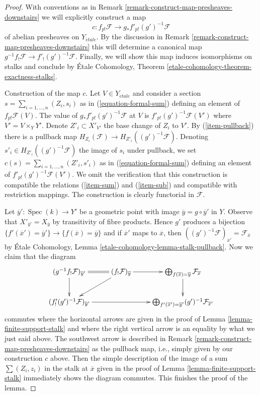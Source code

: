 \documentclass{stacks-project}
\theoremstyle{plain}
\theoremstyle{definition}
\theoremstyle{remark}
\numberwithin{equation}{subsection}
\def\Spec{\mathop{\mathrm{Spec}}}
\def\etale{{\acute{e}tale}}
\begin{document}
\begin{proof}
With conventions as in Remark \ref{remark-construct-map-presheaves-downstairs}
we will explicitly construct a map
$$
c : f_{p!}\mathcal{F} \longrightarrow g_*f'_{p!}(g')^{-1}\mathcal{F}
$$
of abelian presheaves on $Y_\etale$. By the discussion in
Remark \ref{remark-construct-map-presheaves-downstairs}
this will determine a canonical map
$g^{-1}f_!\mathcal{F} \to f'_!(g')^{-1}\mathcal{F}$. Finally, we
will show this map induces isomorphisms on stalks and conclude by
\'Etale Cohomology, Theorem \ref{etale-cohomology-theorem-exactness-stalks}.

\medskip\noindent
Construction of the map $c$. Let $V \in Y_\etale$ and consider a section
$s = \sum_{i = 1, \ldots, n} (Z_i, s_i)$ as in
(\ref{equation-formal-sum}) defining an element of $f_{p!}\mathcal{F}(V)$.
The value of $g_*f'_{p!}(g')^{-1}\mathcal{F}$ at $V$ is
$f'_{p!}(g')^{-1}\mathcal{F}(V')$ where $V' = V \times_Y Y'$.
Denote $Z'_i \subset X'_{V'}$ the base change of $Z_i$ to $V'$.
By (\ref{item-pullback}) there is a pullback map
$H_{Z_i}(\mathcal{F}) \to H_{Z'_i}((g')^{-1}\mathcal{F})$.
Denoting $s'_i \in H_{Z'_i}((g')^{-1}\mathcal{F})$ the image of $s_i$
under pullback, we set $c(s) = \sum_{i = 1, \ldots, n} (Z'_i, s'_i)$ as in
(\ref{equation-formal-sum}) defining an element of
$f'_{p!}(g')^{-1}\mathcal{F}(V')$. We omit the verification
that this construction is compatible the relations
(\ref{item-sum}) and (\ref{item-sub}) and compatible
with restriction mappings. The construction is clearly
functorial in $\mathcal{F}$.

\medskip\noindent
Let $\overline{y}' : \Spec(k) \to Y'$ be a geometric point with image
$\overline{y} = g \circ \overline{y}'$ in $Y$. Observe that
$X'_{\overline{y}'} = X_{\overline{y}}$ by transitivity of
fibre products. Hence $g'$ produces a bijection
$\{f'(\overline{x}') = \overline{y}'\} \to \{f(\overline{x}) = \overline{y}\}$
and if $\overline{x}'$ maps to $\overline{x}$, then
$((g')^{-1}\mathcal{F})_{\overline{x}'} = \mathcal{F}_{\overline{x}}$
by \'Etale Cohomology, Lemma \ref{etale-cohomology-lemma-stalk-pullback}.
Now we claim that the diagram
$$
\xymatrix{
(g^{-1}f_!\mathcal{F})_{\overline{y}'} \ar@{=}[r] \ar[d] &
(f_!\mathcal{F})_{\overline{y}} \ar[r] \ar[ld] &
\bigoplus\nolimits_{f(\overline{x}) = \overline{y}}
\mathcal{F}_{\overline{x}} \ar[d]
\\
(f'_!(g')^{-1}\mathcal{F})_{\overline{y}'} \ar[rr] & &
\bigoplus\nolimits_{f'(\overline{x}') = \overline{y}'}
(g')^{-1}\mathcal{F}_{\overline{x}'}
}
$$
commutes where the horizontal arrows are given in the proof of
Lemma \ref{lemma-finite-support-stalk} and where the right vertical
arrow is an equality by what we just said above. The southwest arrow is
described in Remark \ref{remark-construct-map-presheaves-downstairs}
as the pullback map, i.e.,
simply given by our construction $c$ above. Then the simple
description of the image of a sum $\sum (Z_i, z_i)$ in the
stalk at $\overline{x}$ given in the proof of
Lemma \ref{lemma-finite-support-stalk} immediately shows the
diagram commutes. This finishes the proof of the lemma.
\end{proof}
\end{document}
